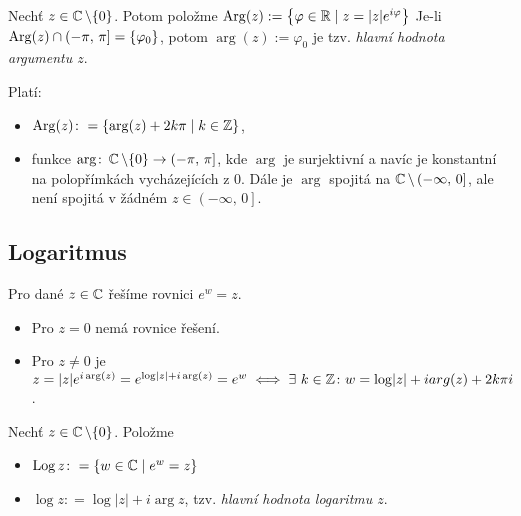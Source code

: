     \begin{notation}
          Nechť $z\in\operatorname{\mathbb{C}}  \setminus\{0\}$. Potom položme $\operatorname*{Arg}(z):=\left\{\varphi\in\operatorname{\mathbb{R}} \mid z=\lvert z \rvert e^{i\varphi}\right\}$ Je-li $\operatorname*{Arg}(z) \cap  (-\pi,\,\pi]=\{\varphi_0\}$, potom $\arg(z):=\varphi_0$ je tzv. \emph{hlavní hodnota argumentu $z$}. %
    \end{notation}
     
         Platí: 
        \begin{itemize}
            \item $\operatorname*{Arg}(z)\colon = \{\arg(z)+2k\pi\mid k\in\operatorname{\mathbb{Z}} \}$,
            \item funkce $\arg\colon \operatorname{\mathbb{C}}\setminus\{0\} \to \left (-\pi,\,\pi\right ]$, kde $\arg$ je surjektivní a navíc je konstantní na polopřímkách vycházejících z $0$. Dále je $\arg$ spojitá na $\operatorname{\mathbb{C}}\setminus\left (-\infty,\,0\right ]$, ale není spojitá v žádném $z\in \left (-\infty,\,0\right ]$.
        \end{itemize}



\subsection{Logaritmus}
Pro dané $z\in\operatorname{\mathbb{C}}  $ řešíme rovnici $e^w=z$. 
\begin{itemize}
    \item Pro $z=0$ nemá rovnice řešení. \item Pro $z\neq 0$ je $z=\lvert z \rvert e^{i  \arg(z)}=e^{\log\lvert z \rvert+i   \arg(z)}=e^w\iff\exists\ k \in\operatorname{\mathbb{Z}} \colon w=\log \lvert z \rvert +i arg(z)+2k\pi i$.
    \end{itemize}

\begin{definition}
Nechť $z\in\operatorname{\mathbb{C}}  \setminus\{0\}$. Položme 
\begin{itemize}
    \item $\operatorname*{Log} z\colon=\{w\in\operatorname{\mathbb{C}}  \mid e^w=z\}$
    \item $\log z\colon= \log\lvert z \rvert + i \arg z$,  tzv. \emph{hlavní hodnota logaritmu $z$}.
\end{itemize}
\end{definition}

